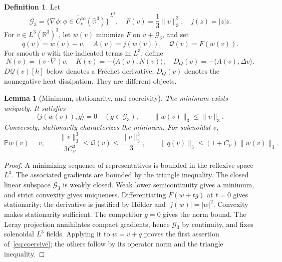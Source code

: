 \documentclass[11pt,a4paper]{article}
\newtheorem{lemma}[theorem]{Lemma}
\theoremstyle{definition}
\newtheorem{definition}[theorem]{Definition}
\newcommand{\R}{\mathbb R}
\newcommand{\G}{\mathcal G_3}
\newcommand{\Q}{\mathcal Q}
\newcommand{\PP}{\mathbb P}
\newcommand{\ip}[2]{\langle #1,#2\rangle}
\begin{document}
\begin{definition}
Let
\[
 \G=\overline{\{\nabla\phi:\phi\in C_c^\infty(\R^3)\}}^{\,L^3},
 \quad F(v)=\frac13\|v\|_3^3,\quad j(z)=|z|z.
\]
For $v\in L^3(\R^3)^3$, let $w(v)$ minimize $F$ on $v+\G$, and set
\begin{equation}\label{eq:objects}
 q(v)=w(v)-v,\quad A(v)=j(w(v)),\quad \Q(v)=F(w(v)).
\end{equation}
For smooth $v$ with the indicated terms in $L^3$, define
\begin{equation}\label{eq:KD}
 N(v)=(v\cdot\nabla)v,\quad
 K(v)=-\ip{A(v)}{N(v)},\quad
 D_Q(v)=-\ip{A(v)}{\Delta v}.
\end{equation}
$D\Q(v)[h]$ below denotes a Fr\'echet derivative; $D_Q(v)$ denotes the nonnegative heat dissipation. They are different objects.
\end{definition}

\begin{lemma}[Minimum, stationarity, and coercivity]\label{lem:min}
The minimum exists uniquely. It satisfies
\begin{equation}\label{eq:stationary}
 \ip{j(w(v))}{g}=0\quad(g\in\G),\qquad
 \|w(v)\|_3\le\|v\|_3.
\end{equation}
Conversely, stationarity characterizes the minimum. For solenoidal $v$,
\begin{equation}\label{eq:coercive}
 \PP w(v)=v,\qquad
 \frac{\|v\|_3^3}{3C_{\PP}^3}\le\Q(v)\le\frac{\|v\|_3^3}{3},\qquad
 \|q(v)\|_3\le(1+C_{\PP})\|w(v)\|_3.
\end{equation}
\end{lemma}
\begin{proof}
A minimizing sequence of representatives is bounded in the reflexive space $L^3$. The associated gradients are bounded by the triangle inequality. The closed linear subspace $\G$ is weakly closed. Weak lower semicontinuity gives a minimum, and strict convexity gives uniqueness. Differentiating $F(w+tg)$ at $t=0$ gives stationarity; the derivative is justified by H\"older and $|j(w)|=|w|^2$. Convexity makes stationarity sufficient. The competitor $g=0$ gives the norm bound. The Leray projection annihilates compact gradients, hence $\G$ by continuity, and fixes solenoidal $L^3$ fields. Applying it to $w=v+q$ proves the first assertion of~\eqref{eq:coercive}; the others follow by its operator norm and the triangle inequality.
\end{proof}
\end{document}
